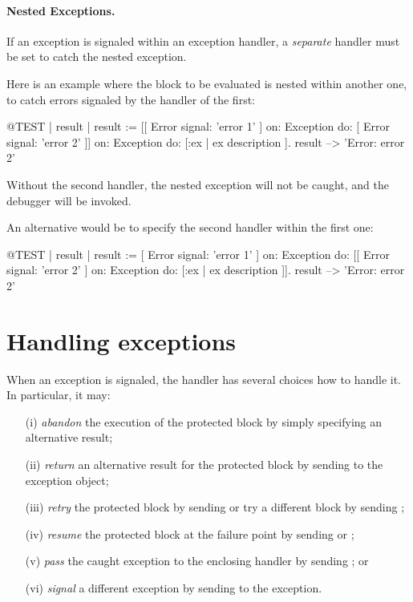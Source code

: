 \documentclass[a4paper,10pt,twoside]{book}
\begin{document}
\paragraph{Nested Exceptions.}
If an exception is signaled within an exception handler, a \emph{separate} handler must be set to catch the nested exception.

Here is an example where the block to be evaluated is nested within another one, to catch errors signaled by the handler of the first:
\begin{code}{@TEST | result |}
result := [[ Error signal: 'error 1' ]
	on: Exception
	do: [ Error signal: 'error 2' ]]
		on: Exception
		do: [:ex | ex description ].
result --> 'Error: error 2'
\end{code}

Without the second handler, the nested exception will not be caught, and the debugger will be invoked.

An alternative would be to specify the second handler within the first one:
\begin{code}{@TEST | result |}
result := [ Error signal: 'error 1' ]
	on: Exception
	do: [[ Error signal: 'error 2' ]
		on: Exception
		do: [:ex | ex description ]].
result --> 'Error: error 2'
\end{code}

\section{Handling exceptions}

When an exception is signaled, the handler has several choices how to handle it.
In particular, it may:
\begin{itemize}
\item[(i)] \emph{abandon} the execution of the protected block by simply specifying an alternative result;
\item[(ii)] \emph{return} an alternative result for the protected block by sending  to the exception object;
\item[(iii)] \emph{retry} the protected block by sending  or try a different block by sending ;
\item[(iv)] \emph{resume} the protected block at the failure point by sending  or ;
\item[(v)] \emph{pass} the caught exception to the enclosing handler by sending ; or
\item[(vi)] \emph{signal} a different exception by sending  to the exception.
\end{itemize}
\end{document}
